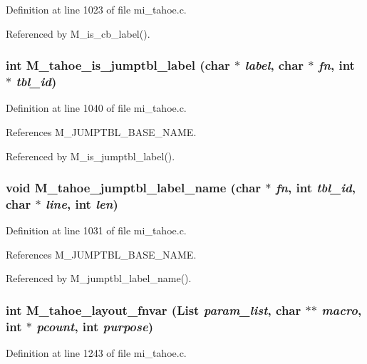 Definition at line 1023 of file mi\_\-tahoe.c.

Referenced by M\_\-is\_\-cb\_\-label().
\subsubsection{\setlength{\rightskip}{0pt plus 5cm}int M\_\-tahoe\_\-is\_\-jumptbl\_\-label (char $\ast$ {\em label}, char $\ast$ {\em fn}, int $\ast$ {\em tbl\_\-id})}\label{m__tahoe_8h_aa2b60fe38beb740f7ef8217418198ca}




Definition at line 1040 of file mi\_\-tahoe.c.

References M\_\-JUMPTBL\_\-BASE\_\-NAME.

Referenced by M\_\-is\_\-jumptbl\_\-label().
\subsubsection{\setlength{\rightskip}{0pt plus 5cm}void M\_\-tahoe\_\-jumptbl\_\-label\_\-name (char $\ast$ {\em fn}, int {\em tbl\_\-id}, char $\ast$ {\em line}, int {\em len})}\label{m__tahoe_8h_bb22237234a735ceb38d71af32be67c7}




Definition at line 1031 of file mi\_\-tahoe.c.

References M\_\-JUMPTBL\_\-BASE\_\-NAME.

Referenced by M\_\-jumptbl\_\-label\_\-name().
\subsubsection{\setlength{\rightskip}{0pt plus 5cm}int M\_\-tahoe\_\-layout\_\-fnvar (\bf{List} {\em param\_\-list}, char $\ast$$\ast$ {\em macro}, int $\ast$ {\em pcount}, int {\em purpose})}\label{m__tahoe_8h_e6dafb74338048f86d32cb046583abd1}




Definition at line 1243 of file mi\_\-tahoe.c.

